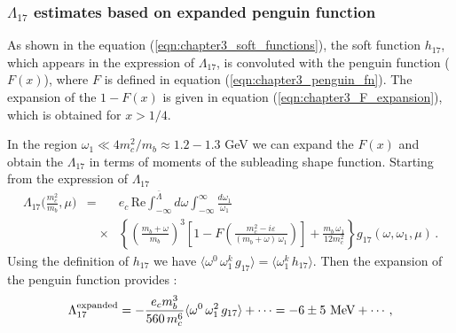 \subsubsection{$\Lambda_{17}$ estimates based on expanded penguin function}
\vspace{-0.2cm}
As shown in the equation (\ref{eqn:chapter3_soft_functions}), the soft function $h_{17}$, which appears in the expression of $\Lambda_{17}$, is convoluted with the penguin function ($F(x)$), where $F$ is defined in equation (\ref{eqn:chapter3_penguin_fn}). The expansion of the $1-F(x)$ is given in equation (\ref{eqn:chapter3_F_expansion}), which is obtained for $x>1/4$.\par
In the region $\omega_1\ll 4m^2_c/m_b\approx 1.2-1.3$ GeV we can expand the $F(x)$ and obtain the $\Lambda_{17}$ in terms of moments of the subleading shape function. Starting from the expression of $\Lambda_{17}$ \cite{Benzke:2010js}
\begin{eqnarray}\label{eqn:chap5_L17power}
   \Lambda_{17}\Big(\frac{m_c^2}{m_b},\mu\Big)
   &=& e_c\,\mbox{Re} \int_{-\infty}^{\bar\Lambda}\!d\omega
    \int_{-\infty}^\infty \frac{d\omega_1}{\omega_1} \nonumber\\
   &\quad\times& \left\{ \left( \frac{m_b+\omega}{m_b} \right)^3 
    \left[ 1 - F\!\left( \frac{m_c^2-i\varepsilon}{(m_b+\omega)\,\omega_1} \right) \right]
    + \frac{m_b\,\omega_1}{12m_c^2} \right\} g_{17}(\omega,\omega_1,\mu) \,.
\end{eqnarray}
Using the definition of $h_{17}$ we have $\langle\omega^0\,\omega_1^k\,g_{17}\rangle=\langle\omega_1^k\,h_{17}\rangle$. Then the expansion of the penguin function provides \cite{Gunawardana:2019gep}:
\begin{equation}\label{eqn:chap5_Lambda17expanded}
\Lambda_{17}^{\mbox{\scriptsize expanded}}=  -\dfrac{e_c m_b^3}{560\,m_c^6} \langle\omega^0\,\omega_1^2\,g_{17}\rangle+\cdots=-6\pm5\mbox{ MeV}+\cdots,
\end{equation}

